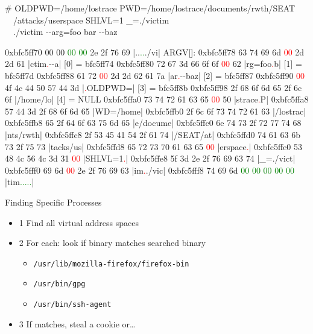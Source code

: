 \documentclass{beamer}
\newenvironment{itemizeframe}[1]
  {\begin{frame}{#1}\startitemizeframe}
  {\stopitemizeframe\end{frame}}
\newcommand\startitemizeframe{\begin{itemize}}
\newcommand\stopitemizeframe{\end{itemize}}
\begin{document}
		\begin{frame}[fragile]
			\scriptsize
			\begin{semiverbatim}
			# OLDPWD=/home/lostrace PWD=/home/lostrace/documents/rwth/SEAT\ \\
			\ \ /attacks/userspace SHLVL=1 _=./victim \ \\
			\ \ ./victim {-}{-}arg=foo bar {-}{-}baz

			0xbfc5ff70  00 00 \textcolor{green}{00 00} 2e 2f 76 69  |..\textcolor{green}{..}./vi|    ARGV[]:
			0xbfc5ff78  63 74 69 6d \textcolor{red}{00} 2d 2d 61  |ctim\textcolor{red}{.}{-}{-}a|      [0] = bfc5ff74
			0xbfc5ff80  72 67 3d 66 6f 6f \textcolor{red}{00} 62  |rg=foo\textcolor{red}{.}b|      [1] = bfc5ff7d
			0xbfc5ff88  61 72 \textcolor{red}{00} 2d 2d 62 61 7a  |ar\textcolor{red}{.}{-}{-}baz|      [2] = bfc5ff87
			0xbfc5ff90  \textcolor{red}{00} 4f 4c 44 50 57 44 3d  |\textcolor{red}{.}OLDPWD=|      [3] = bfc5ff8b
			0xbfc5ff98  2f 68 6f 6d 65 2f 6c 6f  |/home/lo|      [4] = NULL
			0xbfc5ffa0  73 74 72 61 63 65 \textcolor{red}{00} 50  |strace\textcolor{red}{.}P|
			0xbfc5ffa8  57 44 3d 2f 68 6f 6d 65  |WD=/home|
			0xbfc5ffb0  2f 6c 6f 73 74 72 61 63  |/lostrac|
			0xbfc5ffb8  65 2f 64 6f 63 75 6d 65  |e/docume|
			0xbfc5ffc0  6e 74 73 2f 72 77 74 68  |nts/rwth|
			0xbfc5ffc8  2f 53 45 41 54 2f 61 74  |/SEAT/at|
			0xbfc5ffd0  74 61 63 6b 73 2f 75 73  |tacks/us|
			0xbfc5ffd8  65 72 73 70 61 63 65 \textcolor{red}{00}  |erspace\textcolor{red}{.}|
			0xbfc5ffe0  53 48 4c 56 4c 3d 31 \textcolor{red}{00}  |SHLVL=1\textcolor{red}{.}|
			0xbfc5ffe8  5f 3d 2e 2f 76 69 63 74  |_=./vict|
			0xbfc5fff0  69 6d \textcolor{red}{00} 2e 2f 76 69 63  |im\textcolor{red}{.}./vic|
			0xbfc5fff8  74 69 6d \textcolor{green}{00 00 00 00 00}  |tim\textcolor{green}{.....}|
			\end{semiverbatim}
		\end{frame}

		\begin{itemizeframe}{Finding Specific Processes}
			\item[1] Find all virtual address spaces
			\item[2] For each: look if binary matches searched binary
			\begin{itemize}
				\item \texttt{/usr/lib/mozilla-firefox/firefox-bin}
				\item \texttt{/usr/bin/gpg}
				\item \texttt{/usr/bin/ssh-agent}
			\end{itemize}
			\item[3] If matches, steal a cookie or\ldots \uncover<2->{a ssh-private key}
		\end{itemizeframe}
\end{document}
